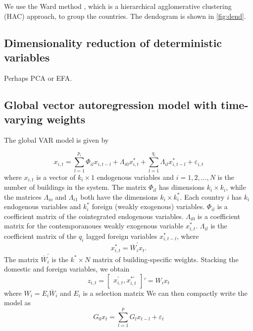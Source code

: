 \documentclass[preprint, 12pt]{elsarticle}
\newcommand{\?}{\stackrel{?}{=}}
\newcommand{\ol}{\overline}
\begin{document}
We use the Ward method \cite{murtagh2014ward}, which is a hierarchical agglomerative clustering (HAC) approach, to group the countries.
The dendogram is shown in \autoref{fig:dend}.

\subsection{Dimensionality reduction of deterministic variables}
Perhaps PCA or EFA.

\subsection{Global vector autoregression model with time-varying weights}
The global VAR model \cite{dees2007exploring} is given by

\begin{equation}
  \label{eq:1}
  x_{i,t} = \sum_{l=1}^{p_{i}}\Phi_{il}x_{i,t-l} + \Lambda_{i0}x_{i,t}^{*} + \sum_{l=1}^{q_{i}}\Lambda_{il}x_{i,t-l}^{*} + \varepsilon_{i,t}
\end{equation}
where $x_{i,t}$ is a vector of $k_{i}\times 1$ endogenous variables and $i = 1, 2, \ldots, N$ is the number of buildings
in the system.  The matrix $\Phi_{il}$ has dimensions $k_{i}\times k_{i}$, while the matrices $\Lambda_{io}$ and
$\Lambda_{i1}$ both have the dimensions $k_{i}\times k_{i}^{*}$.
Each country $i$ has $k_{i}$ endogenous variables and $k_{i}^{*}$ foreign (weakly exogenous) variables.
$\Phi_{il}$ is a coefficient matrix of the cointegrated
endogenous variables. $\Lambda_{i0}$ is a coefficient matrix for the contemporanoues weakly exogenous variable
$x_{i,t}^{*}$. $\Lambda_{il}$ is the coefficient matrix of the $q_{i}$ lagged foreign variables $x_{i,t-l}^{*}$, where
\begin{equation}
  \label{eq:2}
  x_{i,t}^{*} = \ol{W}_{i}^{'}x_{t}.
\end{equation}
The matrix $\ol{W}_{i}^{'}$ is the $k^{*} \times N$ matrix of building-specific weights.
Stacking the domestic and foreign variables, we obtain
\begin{equation}
  \label{eq:3}
  z_{i,t} =
  \begin{bmatrix}
    x_{i,t}^{'}, x_{i,t}^{*'}
  \end{bmatrix}'  = W_{i}x_{t}
\end{equation}
where $W_{i} = E_{i}\ol{W}_{i}$ and $E_{i}$ is a selection matrix We
can then compactly write the model as
\begin{equation}
  \label{eq:4}
  G_{0}x_{t} = \sum_{l=1}^{p}G_{l}x_{t-l} + \varepsilon_{t}
\end{equation}
\end{document}
